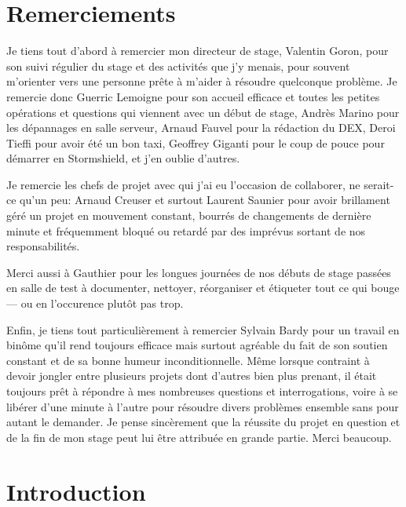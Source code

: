 \documentclass[12pt, oneside, a4paper, titlepage]{report}
\begin{document}
\begin{titlepage}
    
\end{titlepage}

\tableofcontents



\chapter{Remerciements}%
\label{cha:ackn}

Je tiens tout d'abord à remercier mon directeur de stage, Valentin Goron, pour
son suivi régulier du stage et des activités que j'y menais, pour souvent
m'orienter vers une personne prête à m'aider à résoudre quelconque problème. Je
remercie donc Guerric Lemoigne pour son accueil efficace et toutes les petites
opérations et questions qui viennent avec un début de stage, Andrès Marino pour
les dépannages en salle serveur, Arnaud Fauvel pour la rédaction du DEX, Deroi
Tieffi pour avoir été un bon taxi, Geoffrey Giganti pour le coup de pouce pour
démarrer en Stormshield, et j'en oublie d'autres.

Je remercie les chefs de projet avec qui j'ai eu l'occasion de collaborer, ne
serait-ce qu'un peu: Arnaud Creuser et surtout Laurent Saunier pour avoir
brillament géré un projet en mouvement constant, bourrés de changements de
dernière minute et fréquemment bloqué ou retardé par des imprévus sortant de nos
responsabilités.

Merci aussi à Gauthier pour les longues journées de nos débuts de stage passées
en salle de test à documenter, nettoyer, réorganiser et étiqueter tout ce qui
bouge --- ou en l'occurence plutôt pas trop.

Enfin, je tiens tout particulièrement à remercier Sylvain Bardy pour un travail
en binôme qu'il rend toujours efficace mais surtout agréable du fait de son
soutien constant et de sa bonne humeur inconditionnelle. Même lorsque contraint
à devoir jongler entre plusieurs projets dont d'autres bien plus prenant, il
était toujours prêt à répondre à mes nombreuses questions et interrogations,
voire à se libérer d'une minute à l'autre pour résoudre divers problèmes
ensemble sans pour autant le demander. Je pense sincèrement que la réussite du
projet en question et de la fin de mon stage peut lui être attribuée en grande
partie. Merci beaucoup.

\chapter{Introduction}%
\label{cha:intro}
\end{document}
